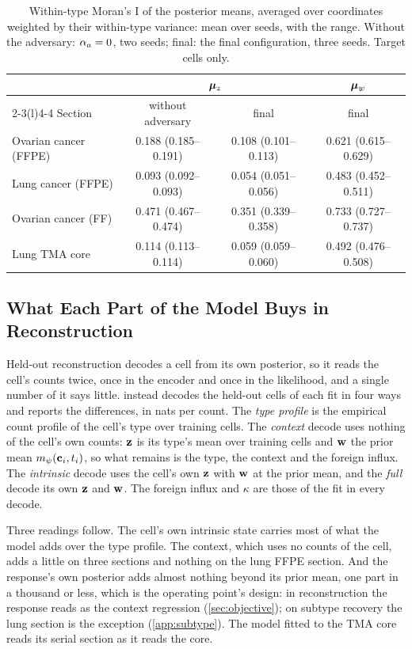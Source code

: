 \begin{table}[t]
\centering
\caption{Within-type Moran's I of the posterior means, averaged over coordinates weighted by their within-type variance: mean over seeds, with the range. Without the adversary: $\alpha_a = 0$, two seeds; final: the final configuration, three seeds. Target cells only.}
\label{tab:moran}
\small
\begin{tabular}{@{}lccc@{}}
\toprule
 & \multicolumn{2}{c}{$\boldsymbol{\mu}_z$} & $\boldsymbol{\mu}_w$ \\
\cmidrule(lr){2-3}\cmidrule(l){4-4}
Section & without adversary & final & final \\
\midrule
Ovarian cancer (FFPE) & 0.188 (0.185--0.191) & 0.108 (0.101--0.113) & 0.621 (0.615--0.629) \\
Lung cancer (FFPE) & 0.093 (0.092--0.093) & 0.054 (0.051--0.056) & 0.483 (0.452--0.511) \\
Ovarian cancer (FF) & 0.471 (0.467--0.474) & 0.351 (0.339--0.358) & 0.733 (0.727--0.737) \\
Lung TMA core & 0.114 (0.113--0.114) & 0.059 (0.059--0.060) & 0.492 (0.476--0.508) \\
\bottomrule
\end{tabular}
\end{table}

\subsection{What Each Part of the Model Buys in Reconstruction}
\label{app:recon-modes}

Held-out reconstruction decodes a cell from its own posterior, so it reads the cell's counts twice, once in the encoder and once in the likelihood, and a single number of it says little.  instead decodes the held-out cells of each fit in four ways and reports the differences, in nats per count. The \emph{type profile} is the empirical count profile of the cell's type over training cells. The \emph{context} decode uses nothing of the cell's own counts: $\mathbf{z}$ is its type's mean over training cells and $\mathbf{w}$ the prior mean $m_{\psi}(\mathbf{c}_i, t_i)$, so what remains is the type, the context and the foreign influx. The \emph{intrinsic} decode uses the cell's own $\mathbf{z}$ with $\mathbf{w}$ at the prior mean, and the \emph{full} decode its own $\mathbf{z}$ and $\mathbf{w}$. The foreign influx and $\kappa$ are those of the fit in every decode.

Three readings follow. The cell's own intrinsic state carries most of what the model adds over the type profile. The context, which uses no counts of the cell, adds a little on three sections and nothing on the lung FFPE section. And the response's own posterior adds almost nothing beyond its prior mean, one part in a thousand or less, which is the operating point's design: in reconstruction the response reads as the context regression (\cref{sec:objective}); on subtype recovery the lung section is the exception (\cref{app:subtype}). The model fitted to the TMA core reads its serial section as it reads the core.

